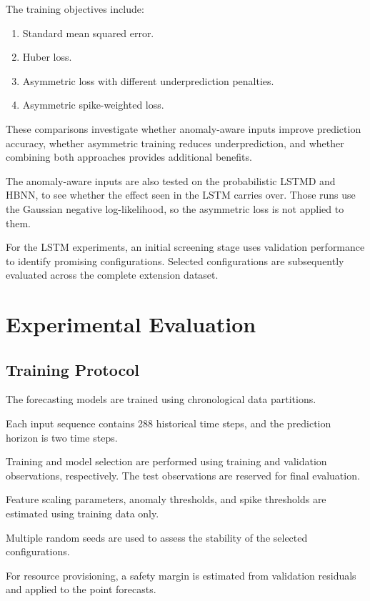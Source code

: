\documentclass[conference]{IEEEtran}
\begin{document}
The training objectives include:

\begin{enumerate}
\item Standard mean squared error.
\item Huber loss.
\item Asymmetric loss with different underprediction penalties.
\item Asymmetric spike-weighted loss.
\end{enumerate}

These comparisons investigate whether anomaly-aware inputs improve prediction accuracy, whether asymmetric training reduces underprediction, and whether combining both approaches provides additional benefits.

The anomaly-aware inputs are also tested on the probabilistic LSTMD and HBNN, to see whether the effect seen in the LSTM carries over. Those runs use the Gaussian negative log-likelihood, so the asymmetric loss is not applied to them.

For the LSTM experiments, an initial screening stage uses validation performance to identify promising configurations. Selected configurations are subsequently evaluated across the complete extension dataset.

\section{Experimental Evaluation}

\subsection{Training Protocol}

The forecasting models are trained using chronological data partitions.

Each input sequence contains 288 historical time steps, and the prediction horizon is two time steps.

Training and model selection are performed using training and validation observations, respectively. The test observations are reserved for final evaluation.

Feature scaling parameters, anomaly thresholds, and spike thresholds are estimated using training data only.

Multiple random seeds are used to assess the stability of the selected configurations.

For resource provisioning, a safety margin is estimated from validation residuals and applied to the point forecasts.
\end{document}

